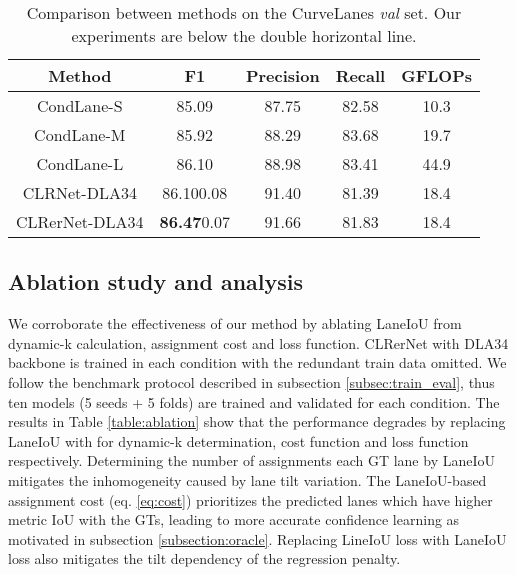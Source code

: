 \documentclass[10pt,twocolumn,letterpaper]{article}
\begin{document}
\begin{table}
\begin{center}
\begin{adjustbox}{width=\linewidth} 
\begin{tabular}{ccccc}
\hline
Method & F1 & Precision & Recall & GFLOPs \\
\hline
CondLane-S\cite{Liu_2021_ICCV}  & 85.09 & 87.75 & 82.58 & 10.3 \\
CondLane-M\cite{Liu_2021_ICCV} & 85.92 & 88.29 & 83.68 & 19.7 \\
CondLane-L\cite{Liu_2021_ICCV} & 86.10 & 88.98 & 83.41  & 44.9 \\
\hline\hline
CLRNet-DLA34\cite{Zheng_2022_CVPR} & 86.10\footnotesize{0.08 }& 91.40 & 81.39  & 18.4 \\
CLRerNet-DLA34 & \textbf{86.47}\footnotesize{0.07} & 91.66 & 81.83 & 18.4 \\
\hline
\end{tabular}
\end{adjustbox}
\end{center}
\caption{Comparison between methods on the CurveLanes \textit{val} set. Our experiments are below the double horizontal line.}
\label{table:curvelanes}
\end{table}


\subsection{Ablation study and analysis}\label{ablation}
We corroborate the effectiveness of our method by ablating LaneIoU from dynamic-k calculation, assignment cost and loss function.
CLRerNet with DLA34 backbone is trained in each condition with the redundant train data omitted.
We follow the benchmark protocol described in subsection \ref{subsec:train_eval}, thus ten models (5 seeds + 5 folds) are trained and validated for each condition. 
The results in Table \ref{table:ablation} show that the performance degrades by replacing LaneIoU with \cite{Zheng_2022_CVPR} for dynamic-k determination, cost function and loss function respectively.
Determining the number of assignments each GT lane by LaneIoU mitigates the inhomogeneity caused by lane tilt variation.
The LaneIoU-based assignment cost (eq. \ref{eq:cost}) prioritizes the predicted lanes which have higher metric IoU with the GTs, leading to more accurate confidence learning as motivated in subsection \ref{subsection:oracle}.
Replacing LineIoU loss with LaneIoU loss also mitigates the tilt dependency of the regression penalty.
\end{document}
